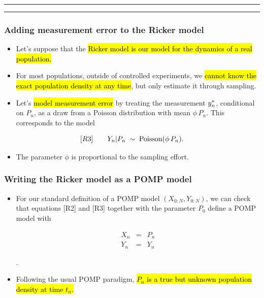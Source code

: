 \documentclass[]{article}
\providecommand{\tightlist}{%
  \setlength{\itemsep}{0pt}\setlength{\parskip}{0pt}}
\begin{document}

\begin{center}\rule{0.5\linewidth}{\linethickness}\end{center}

\begin{center}\rule{0.5\linewidth}{\linethickness}\end{center}

\subsubsection{Adding measurement error to the Ricker
model}\label{adding-measurement-error-to-the-ricker-model}

\begin{itemize}
\item
  Let's suppose that the \hl{Ricker model is our model for the dynamics of a
  real population.}
\item
  For most populations, outside of controlled experiments, we \hl{cannot
  know the exact population density at any time}, but only estimate it
  through sampling.
\item
  Let's \hl{model measurement error} by treating the measurement
  \(y_{n}^*\), conditional on \(P_n\), as a draw from a Poisson
  distribution with mean \(\phi\,P_n\). This corresponds to the model
\end{itemize}

$$[R3] \quad\quad \displaystyle Y_{n}|P_n\;\sim\;\mathrm{Poisson}(\phi\,P_{n}).$$

\begin{itemize}
\tightlist
\item
  The parameter \(\phi\) is proportional to the sampling effort.
\end{itemize}

\subsubsection{Writing the Ricker model as a POMP
model}\label{writing-the-ricker-model-as-a-pomp-model}

\begin{itemize}
\item
  For our standard definition of a POMP model \((X_{0:N},Y_{0:N})\), we
  can check that equations {[}R2{]} and {[}R3{]} together with the
  parameter \(P_0\) define a POMP model with

  \begin{eqnarray}
  X_n &=& P_n \\
  Y_n &=& Y_n 
  \end{eqnarray}

  .
\item
  Following the usual POMP paradigm, \hl{$P_n$ is a true but unknown
  population density at time $t_n$.}
\end{itemize}
\end{document}
